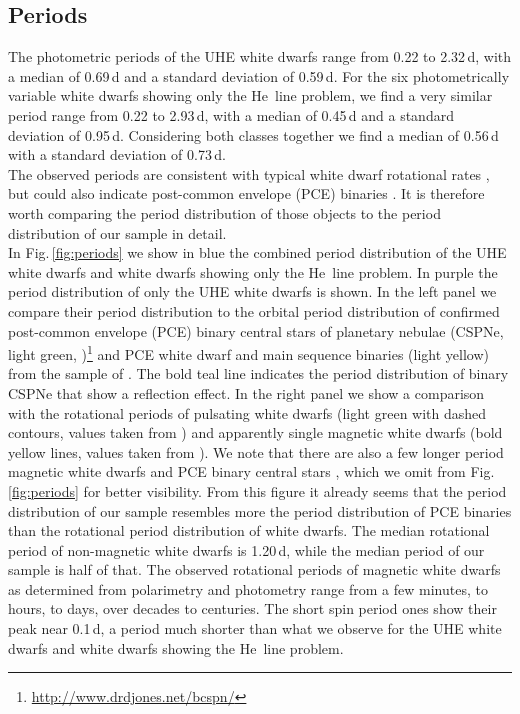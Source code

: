 \documentclass{aa}
\newcounter{Rco}
\newcommand{\Ionst}[1]{\setcounter{Rco}{#1}\Roman{Rco}}
\newcommand{\Ion}[2]{\mbox{#1\,{\scriptsize\Ionst{#2}}}}
\newcommand{\fg}[1]{\mbox{Fig.\,\ref{#1}}}
\begin{document}
 
\subsection{Periods}
 
The photometric periods of the UHE white dwarfs range from 0.22 to
2.32\,d, with a median of 0.69\,d and a standard deviation of 0.59\,d.
For the six photometrically variable white dwarfs showing only the \Ion{He}{2} line
problem, we find a very similar period range from 0.22 to 2.93\,d, with a
median of 0.45\,d and a standard deviation of 0.95\,d. Considering both classes
together we find a median of 0.56\,d with a standard deviation of 0.73\,d.\\
The observed periods are consistent with typical white dwarf rotational rates
\citep{Kawaler2004, Hermes+2017}, but could also indicate post-common
envelope (PCE) binaries \citep{Nebot+2011}. It is therefore worth comparing
the period distribution of those objects to the period distribution of our
sample in detail.\\
In \fg{fig:periods} we show in blue the combined period distribution of
the UHE white dwarfs and white dwarfs showing only the \Ion{He}{2} line
problem. In purple the period distribution of only the UHE white dwarfs is
shown. In the left panel we compare their period distribution to the orbital
period distribution of confirmed post-common envelope (PCE) binary central stars
of planetary nebulae (CSPNe, light green,
\citealt{Jones+Boffin2017, Boffin+Jones+2019})\footnote{\url{http://www.drdjones.net/bcspn/}} and
PCE white dwarf and main sequence binaries (light yellow) from the sample of \cite{Nebot+2011}.
The bold teal line indicates the period distribution of binary CSPNe that
show a reflection effect. In the right panel we show a comparison with the
rotational periods of pulsating white dwarfs (light green with dashed
contours, values taken from \citealt{Kawaler2004, Hermes+2017}) and apparently
single magnetic white dwarfs (bold yellow lines, values taken from \citealt{Ferrario+2015}).
We note that there are also a few longer period magnetic white dwarfs
\citep{Putney+Jordan1995, Bergeron1997, Schmidt1999, Kawka+Vennes2012}
and PCE binary central stars \citep{Miszalski+2018b, Miszalski+2018a, Brown+2019},
which we omit from \fg{fig:periods} for better visibility.
From this figure it already seems that the period distribution of our sample
resembles more the period distribution of PCE binaries than
the rotational period distribution of white dwarfs. The median rotational period
of non-magnetic white dwarfs is 1.20\,d, while the median period of our sample
is half of that.
The observed rotational periods of magnetic white dwarfs as determined from
polarimetry and photometry range from a few minutes, to hours, to days,
over decades to centuries. The short spin period ones show their peak near
0.1\,d, a period much shorter than what we observe for the UHE white dwarfs and
white dwarfs showing the \Ion{He}{2} line problem.
 
\end{document}

